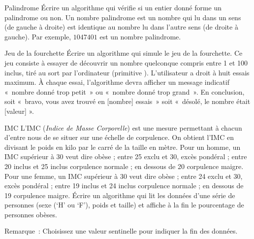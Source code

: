 \begin{Exercice}{Palindrome}
	Écrire un algorithme qui vérifie si un entier donné 
	forme un palindrome ou non. 
	Un nombre palindrome est un nombre qui lu dans un sens 
	(de gauche à droite) est identique au nombre lu dans l’autre sens 
	(de droite à gauche). 
	Par exemple, $1047401$ est un nombre palindrome.
\end{Exercice}

\begin{Exercice}{Jeu de la fourchette}
	Écrire un algorithme qui simule le jeu de la
	fourchette. Ce jeu consiste à essayer de découvrir un nombre quelconque
	compris entre 1 et 100 inclus, tiré au sort par l’ordinateur (primitive
	). L’utilisateur a droit à huit essais
	maximum. À chaque essai, l’algorithme devra afficher un message
	indicatif «~nombre donné trop petit~» ou «~nombre donné trop grand~».
	En conclusion, soit «~bravo, vous avez trouvé en [nombre] essais~» soit
	«~désolé, le nombre était [valeur] ».
\end{Exercice}

\begin{Exercice}{IMC}
	L’IMC (\textit{Indice de Masse Corporelle}) est une mesure permettant à
	chacun d’entre nous de se situer sur une échelle de corpulence. On
	obtient l’IMC en divisant le poids en kilo par le carré de la taille en
	mètre. Pour un homme, un IMC supérieur à 30 veut dire obèse ; entre 25
	exclu et 30, excès pondéral ; entre 20 inclus et 25 inclus corpulence
	normale ; en dessous de 20 corpulence maigre. Pour une femme, un IMC
	supérieur à 30 veut dire obèse ; entre 24 exclu et 30, excès pondéral ;
	entre 19 inclus et 24 inclus corpulence normale ; en dessous de 19
	corpulence maigre. Écrire un algorithme qui lit les données d’une série
	de personnes (sexe (‘H’ ou ‘F’), poids et taille) et affiche à la fin
	le pourcentage de personnes obèses.

	Remarque~: Choisissez une valeur sentinelle pour indiquer la fin des
	données.
\end{Exercice}

